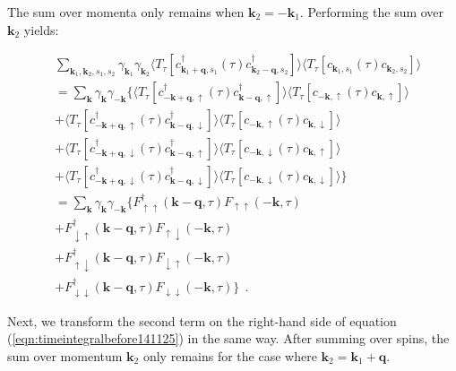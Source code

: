 \documentclass[a4j]{jsarticle}
\begin{document}
The sum over momenta only remains when $\bm{k}_{2}=-\bm{k}_{1}$.
Performing the sum over $\bm{k}_{2}$ yields:

\begin{align}
	&
	\sum_{\bm{k}_{1} , \bm{k}_{2} , s_{1} ,s_{2} }
	\gamma_{\bm{k}_{1}}
	\gamma_{\bm{k}_{2}}
	\langle T_{\tau} [
			c_{ \bm{k}_{1}+\bm{q} , s_{1} }^{\dagger} (\tau)
			c_{ \bm{k}_{2}-\bm{q} , s_{2} }^{\dagger}
		] \rangle
	\langle T_{\tau} [
			c_{ \bm{k}_{1} , s_{1} } (\tau)
			c_{ \bm{k}_{2} , s_{2} }
		] \rangle
	\\ &=
	\sum_{ \bm{k} }
	\gamma_{\bm{k}}
	\gamma_{-\bm{k}}
	\Big\{
	\langle T_{\tau} [
			c_{ - \bm{k} + \bm{q} , \uparrow }^{\dagger} (\tau)
			c_{ \bm{k} - \bm{q} , \uparrow }^{\dagger}
		] \rangle
	\langle T_{\tau} [
			c_{ - \bm{k} , \uparrow } (\tau)
			c_{ \bm{k} , \uparrow }
		] \rangle
	\nonumber \\ &+
	\langle T_{\tau} [
			c_{ - \bm{k} + \bm{q} , \uparrow }^{\dagger} (\tau)
			c_{ \bm{k} - \bm{q} , \downarrow }^{\dagger}
		] \rangle
	\langle T_{\tau} [
			c_{ - \bm{k} , \uparrow } (\tau)
			c_{ \bm{k} , \downarrow }
		] \rangle
	\nonumber \\[2mm] &+
	\langle T_{\tau} [
			c_{ - \bm{k} + \bm{q} , \downarrow }^{\dagger} (\tau)
			c_{ \bm{k} - \bm{q} , \uparrow }^{\dagger}
		] \rangle
	\langle T_{\tau} [
			c_{ - \bm{k} , \downarrow } (\tau)
			c_{ \bm{k} , \uparrow }
		] \rangle
	\nonumber \\[2mm] &+
	\langle T_{\tau} [
			c_{ - \bm{k} + \bm{q} , \downarrow }^{\dagger} (\tau)
			c_{ \bm{k} - \bm{q} , \downarrow }^{\dagger}
		] \rangle
	\langle T_{\tau} [
			c_{ - \bm{k} , \downarrow } (\tau)
			c_{ \bm{k} , \downarrow }
		] \rangle
	\Big\}
	\nonumber \\[2mm]
	&=
	\sum_{ \bm{k} }
	\gamma_{\bm{k}}
	\gamma_{-\bm{k}}
	\Big\{
	F_{ \uparrow \uparrow }^{\dagger}( \bm{k} - \bm{q} , \tau )
	F_{ \uparrow \uparrow } ( - \bm{k} , \tau )
	\nonumber \\ &+
	F_{ \downarrow \uparrow }^{\dagger}( \bm{k} - \bm{q} , \tau )
	F_{ \uparrow \downarrow } ( - \bm{k} , \tau )
	\nonumber \\[2mm] &+
	F_{ \uparrow \downarrow }^{\dagger}( \bm{k} - \bm{q} , \tau )
	F_{ \downarrow \uparrow } ( - \bm{k} , \tau )
	\nonumber \\[2mm] &+
	F_{ \downarrow \downarrow }^{\dagger}( \bm{k} - \bm{q} , \tau )
	F_{ \downarrow \downarrow } ( - \bm{k} , \tau )
	\Big\}
	\ \ .
\end{align}

Next, we transform the second term on the right-hand side of equation (\ref{eqn:timeintegralbefore141125}) in the same way.
After summing over spins, the sum over momentum $\bm{k}_{2}$ only remains for the case where $\bm{k}_{2} = \bm{k}_{1} + \bm{q}$.
\end{document}
